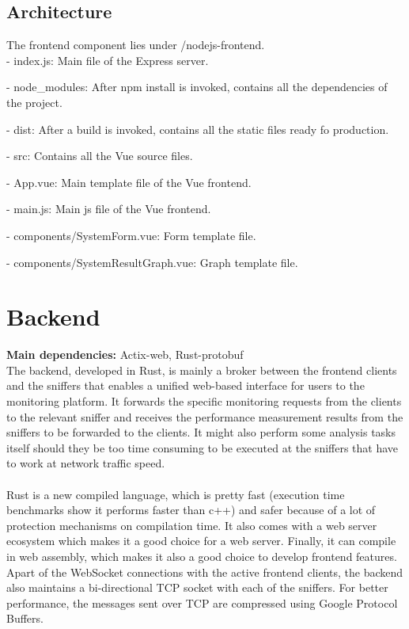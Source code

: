 \documentclass[12pt,hidelinks]{article}
\begin{document}
\subsection{Architecture}
The frontend component lies under /nodejs-frontend. \\

- index.js:
Main file of the Express server.

- node\_modules:
After npm install is invoked, contains all the dependencies of the project.

- dist: 
After a build is invoked, contains all the static files ready fo production.

- src:
Contains all the Vue source files.

	\hspace*{10mm}- App.vue:
	Main template file of the Vue frontend.

	\hspace*{10mm}- main.js:
	Main js file of the Vue frontend.

	\hspace*{10mm}- components/SystemForm.vue:
	Form template file.

	\hspace*{10mm}- components/SystemResultGraph.vue:
	Graph template file.

\section{Backend}
\vspace{7.5cm}

\textbf{Main dependencies:} Actix-web, Rust-protobuf 
\\
The backend, developed in Rust, is mainly a broker between the frontend clients and the sniffers that enables a unified web-based interface for users to the monitoring platform. It forwards the specific monitoring requests from the clients to the relevant sniffer and receives the performance measurement results from the sniffers to be forwarded to the clients. It might also perform some analysis tasks itself should they be too time consuming to be executed at the sniffers that have to work at network traffic speed. \\
\\
Rust is a new compiled language, which is pretty fast (execution time benchmarks show it performs faster than c++) and safer because of a lot of protection mechanisms on compilation time. It also comes with a web server ecosystem which makes it a good choice for a web server. Finally, it can compile in web assembly, which makes it also a good choice to develop frontend features. Apart of the WebSocket connections with the active frontend clients, the backend also maintains a bi-directional TCP socket with each of the sniffers. 
For better performance, the messages sent over TCP are compressed using Google Protocol Buffers.\\
\\
\end{document}

